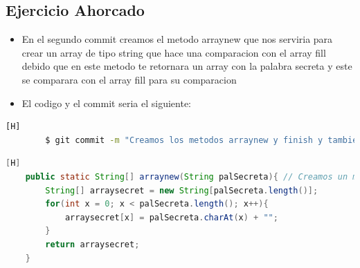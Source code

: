 \documentclass{article}
\begin{document}
	\subsection{Ejercicio Ahorcado}
	\begin{itemize}	
		\item En el segundo commit creamos el metodo arraynew que nos serviria para crear un array de tipo string que hace una comparacion con el array fill debido que en este metodo te retornara un array con la palabra secreta y este se comparara con el array fill para su comparacion   
		\item El codigo y el commit seria el siguiente:
	\end{itemize}
	\begin{lstlisting}[language=bash,caption={Commit}][H]
		$ git commit -m "Creamos los metodos arraynew y finish y tambien ponemos una estructura de control en el ciclo while"
	\end{lstlisting}
	\begin{lstlisting}[language=java,caption={Las lineas de codigo de lo creado:}][H]
	public static String[] arraynew(String palSecreta){ // Creamos un metodo que cree un array para poder usarlo como un comparador que se ve en el metodo finalizar
        String[] arraysecret = new String[palSecreta.length()];
        for(int x = 0; x < palSecreta.length(); x++){
            arraysecret[x] = palSecreta.charAt(x) + "";
        }
        return arraysecret;
    }
	\end{lstlisting}
\end{document}
